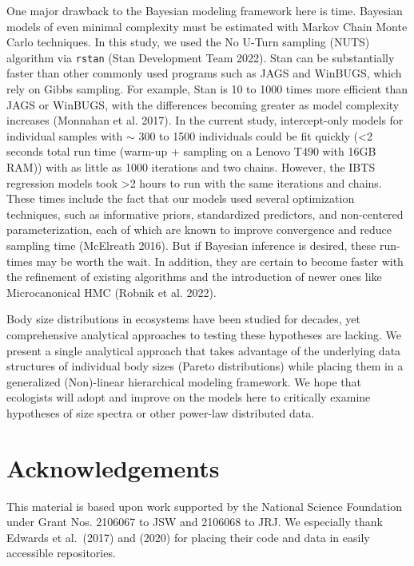 \documentclass[
  12pt,
]{article}
\begin{document}
One major drawback to the Bayesian modeling framework here is time.
Bayesian models of even minimal complexity must be estimated with Markov
Chain Monte Carlo techniques. In this study, we used the No U-Turn
sampling (NUTS) algorithm via \texttt{rstan} (Stan Development Team
2022). Stan can be substantially faster than other commonly used
programs such as JAGS and WinBUGS, which rely on Gibbs sampling. For
example, Stan is 10 to 1000 times more efficient than JAGS or WinBUGS,
with the differences becoming greater as model complexity increases
(Monnahan et al. 2017). In the current study, intercept-only models for
individual samples with \(\sim\) 300 to 1500 individuals could be fit
quickly (\textless2 seconds total run time (warm-up + sampling on a
Lenovo T490 with 16GB RAM)) with as little as 1000 iterations and two
chains. However, the IBTS regression models took \textgreater2 hours to
run with the same iterations and chains. These times include the fact
that our models used several optimization techniques, such as
informative priors, standardized predictors, and non-centered
parameterization, each of which are known to improve convergence and
reduce sampling time (McElreath 2016). But if Bayesian inference is
desired, these run-times may be worth the wait. In addition, they are
certain to become faster with the refinement of existing algorithms and
the introduction of newer ones like Microcanonical HMC (Robnik et al.
2022).

Body size distributions in ecosystems have been studied for decades, yet
comprehensive analytical approaches to testing these hypotheses are
lacking. We present a single analytical approach that takes advantage of
the underlying data structures of individual body sizes (Pareto
distributions) while placing them in a generalized (Non)-linear
hierarchical modeling framework. We hope that ecologists will adopt and
improve on the models here to critically examine hypotheses of size
spectra or other power-law distributed data.

\hypertarget{acknowledgements}{%
\section{Acknowledgements}\label{acknowledgements}}

This material is based upon work supported by the National Science
Foundation under Grant Nos. 2106067 to JSW and 2106068 to JRJ. We
especially thank Edwards et al.~(2017) and (2020) for placing their code
and data in easily accessible repositories.
\end{document}

